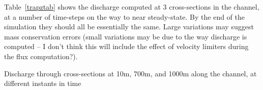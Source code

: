 Table~\ref{trapztab} shows the discharge computed at 3 cross-sections in the channel, at a number of time-steps on the way to near steady-state. By the end of the simulation they should all be essentially the same. Large variations may suggest mass conservation errors (small variations may be due to the way discharge is computed -- I don't think this will include the effect of velocity limiters during the flux computation?).

\begin{table}
\caption{Discharge through cross-sections at 10m, 700m, and 1000m along the channel, at different instants in time}
\label{trapztab}
\end{table}

\endinput
